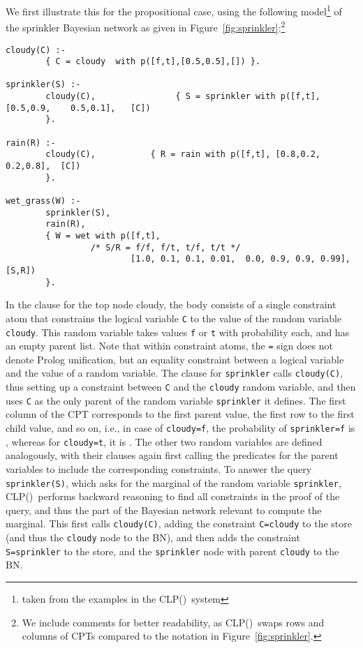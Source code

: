 \documentclass[a4paper]{article}
\newcommand{\clpbn}
  {CLP()}
\begin{document}
We first illustrate this for the propositional case, using the
following model\footnote{taken from the examples in the \clpbn\
  system} of the sprinkler Bayesian network as given in
Figure~\ref{fig:sprinkler}:\footnote{We include comments 
for better readability, as \clpbn\ swaps rows and columns of CPTs
  compared to the notation in Figure~\ref{fig:sprinkler}.} 
\begin{verbatim}
cloudy(C) :-
        { C = cloudy  with p([f,t],[0.5,0.5],[]) }.

sprinkler(S) :-
        cloudy(C),                { S = sprinkler with p([f,t], [0.5,0.9,    0.5,0.1],   [C])
        }.

rain(R) :-
        cloudy(C),           { R = rain with p([f,t], [0.8,0.2,   0.2,0.8],  [C])
        }.

wet_grass(W) :-
        sprinkler(S),
        rain(R),
        { W = wet with p([f,t],
                 /* S/R = f/f, f/t, t/f, t/t */
                         [1.0, 0.1, 0.1, 0.01,  0.0, 0.9, 0.9, 0.99], [S,R])
        }.
\end{verbatim}
In the clause for the top node cloudy, the body consists of a single
constraint atom that constrains the
logical variable \verb|C| to the value of the 
random variable \verb|cloudy|. This random variable takes values \verb|f| or \verb|t|
with probability  each, and has an empty parent list. Note that
within constraint atoms, the \verb|=| sign does not denote Prolog unification,
but an equality constraint between a logical variable and the value of
a random variable. 
 The clause for
\verb|sprinkler| calls \verb|cloudy(C)|, thus setting up a
constraint between \verb|C| and the \verb|cloudy| random variable, and
then uses \verb|C| as the only parent of the 
random variable \verb|sprinkler| it defines. The first column of the CPT corresponds
to the first parent value, the first row to the first child value, and
so on, i.e., in case of \verb|cloudy=f|, the probability of
\verb|sprinkler=f| is , whereas for \verb|cloudy=t|, it is
. The other two random variables are defined analogously, with
their clauses again first calling the predicates for the parent
variables to include the corresponding constraints.  To answer the
query \verb|sprinkler(S)|, which asks for the marginal of the random
variable \verb|sprinkler|, \clpbn\ performs backward reasoning to
find all constraints in the proof of the query, and thus the part of
the Bayesian network relevant to compute the marginal. This first
calls \verb|cloudy(C)|, adding the constraint \verb|C=cloudy| to the
store (and thus the \verb|cloudy| node to the BN), and then adds the
constraint \verb|S=sprinkler| to the store, and the \verb|sprinkler|
node with parent \verb|cloudy| to the BN. 
\end{document}
